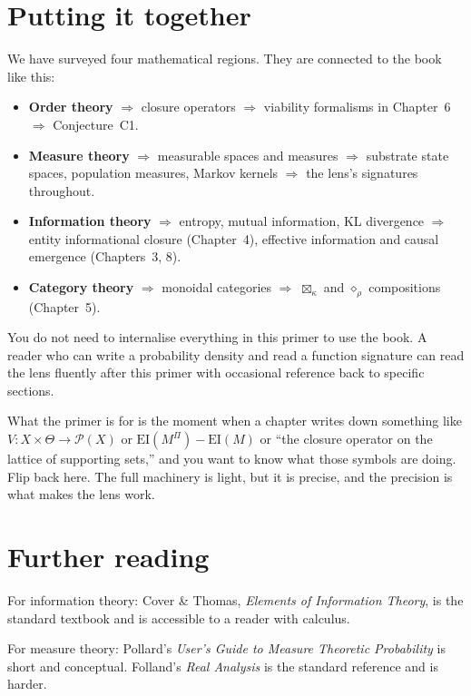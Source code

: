 \section{Putting it together}

We have surveyed four mathematical regions. They are connected to
the book like this:

\begin{itemize}[leftmargin=1.5em,itemsep=2pt]
  \item \textbf{Order theory} $\Rightarrow$ closure operators
    $\Rightarrow$ viability formalisms in Chapter~6 $\Rightarrow$
    Conjecture~C1.
  \item \textbf{Measure theory} $\Rightarrow$ measurable spaces and
    measures $\Rightarrow$ substrate state spaces, population
    measures, Markov kernels $\Rightarrow$ the lens's signatures
    throughout.
  \item \textbf{Information theory} $\Rightarrow$ entropy, mutual
    information, KL divergence $\Rightarrow$ entity informational
    closure (Chapter~4), effective information and causal emergence
    (Chapters~3, 8).
  \item \textbf{Category theory} $\Rightarrow$ monoidal categories
    $\Rightarrow$ $\boxtimes_\kappa$ and $\diamond_\rho$
    compositions (Chapter~5).
\end{itemize}

You do not need to internalise everything in this primer to use the
book. A reader who can write a probability density and read a
function signature can read the lens fluently after this primer
with occasional reference back to specific sections.

What the primer is for is the moment when a chapter writes down
something like $V : X \times \Theta \to \mathcal{P}(X)$ or
$\mathrm{EI}(M^\Pi) - \mathrm{EI}(M)$ or ``the closure operator on
the lattice of supporting sets,'' and you want to know what those
symbols are doing. Flip back here. The full machinery is light, but
it is precise, and the precision is what makes the lens work.

\section*{Further reading}

For information theory: Cover \& Thomas, \textit{Elements of
Information Theory}, is the standard textbook and is accessible to
a reader with calculus.

For measure theory: Pollard's \textit{User's Guide to Measure
Theoretic Probability} is short and conceptual. Folland's
\textit{Real Analysis} is the standard reference and is harder.

